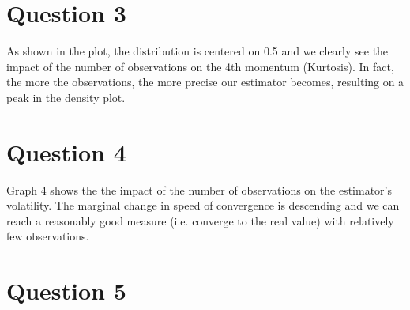 \section{Question 3}
As shown in the plot, the distribution is centered on 0.5 and we clearly see the impact of the number of observations on the 4th momentum (Kurtosis). In fact, the more the observations, the more precise our estimator becomes, resulting on a peak in the density plot.
\section{Question 4}
Graph 4 shows the the impact of the number of observations on the estimator's volatility. The marginal change in speed of convergence is descending and we can reach a reasonably good measure (i.e. converge to the real value) with relatively few observations.
\section{Question 5}